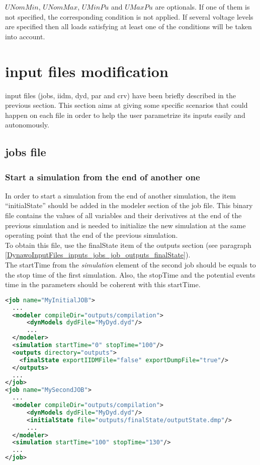 \documentclass[a4paper, 12pt]{report}
\begin{document}
$UNomMin$, $UNomMax$, $UMinPu$ and $UMaxPu$ are optionals. If one of them is not
specified, the corresponding condition is not applied.
If several voltage levels are specified then all loads satisfying at least one of the conditions will be taken into account.

\section[Dynawo input files scenarios]{\Dynawo input files modification}

\Dynawo input files (jobs, iidm, dyd, par and crv) have been briefly described in the previous section.
This section aims at giving some specific scenarios that could happen on each file in order to help the user parametrize its inputs easily and autonomously.

\subsection{jobs file}

\subsubsection{Start a simulation from the end of another one}
\label{DynawoInputFiles_inputs_howto_jobs_job_modeler_initialState}

In order to start a simulation from the end of another simulation, the item ``initialState'' should be added in the modeler section of the job file.
This binary file contains the values of all variables and their derivatives at the end of the previous simulation and is needed to initialize the new simulation at the same operating point that the end of the previous simulation. \\
To obtain this file, use the finalState item of the outputs section (see paragraph \ref{DynawoInputFiles_inputs_jobs_job_outputs_finalState}).\\
The startTime from the \textit{simulation} element of the second job should be equals to the stop time of the first simulation.
Also, the stopTime and the potential events time in the parameters should be coherent with this startTime.

\begin{lstlisting}[language=XML, morekeywords={initialState}]
<job name="MyInitialJOB">
  ...
  <modeler compileDir="outputs/compilation">
      <dynModels dydFile="MyDyd.dyd"/>
      ...
  </modeler>
  <simulation startTime="0" stopTime="100"/>
  <outputs directory="outputs">
    <finalState exportIIDMFile="false" exportDumpFile="true"/>
  </outputs>
  ...
</job>
<job name="MySecondJOB">
  ...
  <modeler compileDir="outputs/compilation">
      <dynModels dydFile="MyDyd.dyd"/>
      <initialState file="outputs/finalState/outputState.dmp"/>
      ...
  </modeler>
  <simulation startTime="100" stopTime="130"/>
  ...
</job>
\end{lstlisting}
\end{document}
